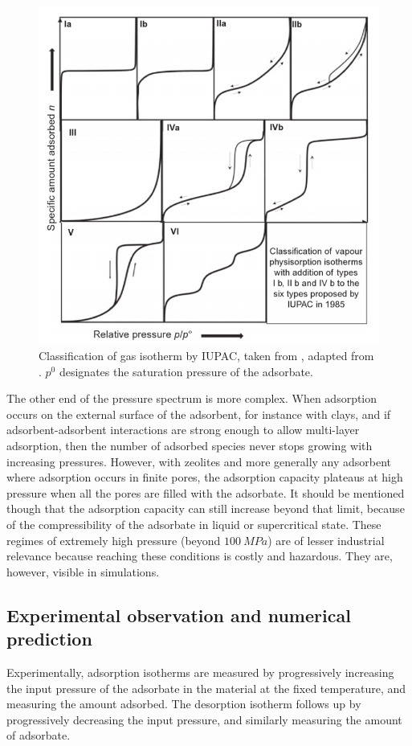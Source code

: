\documentclass[main.tex]{subfiles}
\begin{document}
\begin{figure}[t]
	\centering
	\includegraphics[width=0.6\columnwidth]{figures/database/IsothermTypes.png}
	\caption{Classification of gas isotherm by IUPAC, taken from \cite{Rouquerol2013}, adapted from \cite{IUPAC1985}. $p^0$ designates the saturation pressure of the adsorbate.}\label{fig:IUPACisotherms}
\end{figure}

The other end of the pressure spectrum is more complex. When adsorption occurs on the external surface of the adsorbent, for instance with clays, and if adsorbent-adsorbent interactions are strong enough to allow multi-layer adsorption, then the number of adsorbed species never stops growing with increasing pressures. However, with zeolites and more generally any adsorbent where adsorption occurs in finite pores, the adsorption capacity plateaus at high pressure when all the pores are filled with the adsorbate. It should be mentioned though that the adsorption capacity can still increase beyond that limit, because of the compressibility of the adsorbate in liquid or supercritical state. These regimes of extremely high pressure (beyond $\qty{100}{MPa}$) are of lesser industrial relevance because reaching these conditions is costly and hazardous. They are, however, visible in simulations.

\subsection{Experimental observation and numerical prediction}

\label{experimentalisotherm}

Experimentally, adsorption isotherms are measured by progressively increasing the input pressure of the adsorbate in the material at the fixed temperature, and measuring the amount adsorbed. The desorption isotherm follows up by progressively decreasing the input pressure, and similarly measuring the amount of adsorbate.
\end{document}
